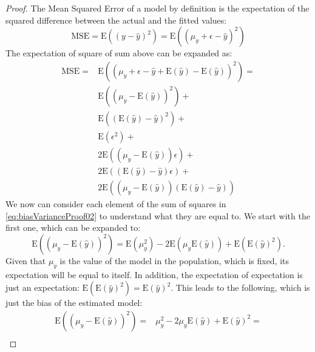 \documentclass[
]{book}
\theoremstyle{definition}
\theoremstyle{definition}
\theoremstyle{definition}
\theoremstyle{definition}
\theoremstyle{remark}
\begin{document}
\begin{proof}
The Mean Squared Error of a model by definition is the expectation of the squared difference between the actual and the fitted values:
\begin{equation}
    \mathrm{MSE} = \mathrm{E}\left((y -\hat{y})^2\right) = \mathrm{E}\left((\mu_y +\epsilon -\hat{y})^2\right)
    \label{eq:biasVarianceProof01}
\end{equation}
The expectation of square of sum above can be expanded as:
\begin{equation}
  \begin{aligned}
    \mathrm{MSE} = & \mathrm{E}\left(\left(\mu_y +\epsilon -\hat{y} +\mathrm{E}(\hat{y}) -\mathrm{E}(\hat{y})\right)^2\right) =\\
                    & \mathrm{E}\left((\mu_y -\mathrm{E}(\hat{y}))^2\right) +\\
                    & \mathrm{E}\left((\mathrm{E}(\hat{y}) -\hat{y})^2\right) +\\
                    & \mathrm{E}(\epsilon^2) +\\
                    & 2\mathrm{E}\left((\mu_y -\mathrm{E}(\hat{y})) \epsilon \right) +\\
                    & 2\mathrm{E}\left((\mathrm{E}(\hat{y}) -\hat{y}) \epsilon \right) +\\
                    & 2\mathrm{E}\left((\mu_y -\mathrm{E}(\hat{y}))(\mathrm{E}(\hat{y}) -\hat{y}) \right)
  \end{aligned}
    \label{eq:biasVarianceProof02}
\end{equation}
We now can consider each element of the sum of squares in \eqref{eq:biasVarianceProof02} to understand what they are equal to. We start with the first one, which can be expanded to:
\begin{equation}
    \mathrm{E}\left((\mu_y -\mathrm{E}(\hat{y}))^2\right) = \mathrm{E}(\mu_y^2) -2 \mathrm{E}(\mu_y \mathrm{E}(\hat{y})) + \mathrm{E}(\mathrm{E}(\hat{y})^2).
    \label{eq:biasVarianceProof03}
\end{equation}
Given that \(\mu_y\) is the value of the model in the population, which is fixed, its expectation will be equal to itself. In addition, the expectation of expectation is just an expectation: \(\mathrm{E}(\mathrm{E}(\hat{y})^2)=\mathrm{E}(\hat{y})^2\). This leads to the following, which is just the bias of the estimated model:
\begin{equation}
  \begin{aligned}
    \mathrm{E}\left((\mu_y -\mathrm{E}(\hat{y}))^2\right) = & \mu_y^2 -2 \mu_y \mathrm{E}(\hat{y}) + \mathrm{E}(\hat{y})^2 = \\

\end{aligned}
\end{equation}
\end{proof}
\end{document}
